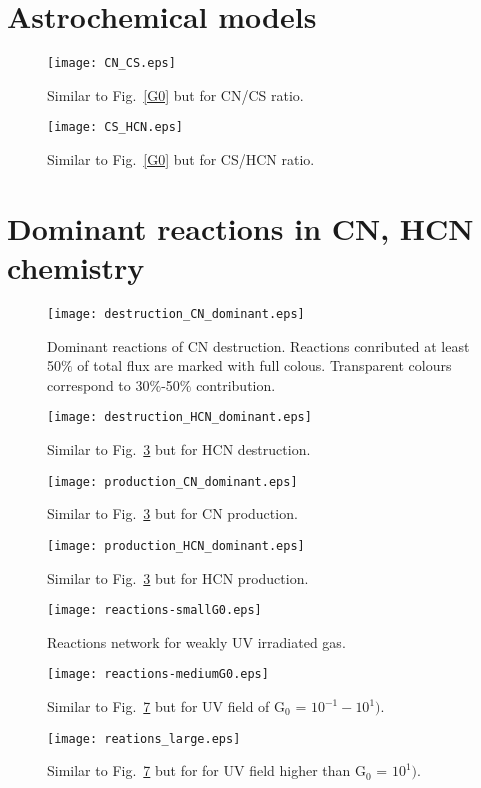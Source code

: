 \documentclass{aa}
\begin{document}
\begin{appendix}
\section{Astrochemical models}
\begin{figure}
   \centering
   \texttt{[image: CN\_CS.eps]}
      \caption{Similar to Fig.~\ref{G0} but for CN/CS ratio.}
         \label{CN/CS}
   \end{figure}

\begin{figure}
   \centering
   \texttt{[image: CS\_HCN.eps]}
      \caption{Similar to Fig.~\ref{G0} but for CS/HCN ratio.}
         \label{CS/HCN}
   \end{figure}

\section{Dominant reactions in CN, HCN chemistry}

\begin{figure}
\texttt{[image: destruction\_CN\_dominant.eps]}
\caption{Dominant reactions of CN destruction. Reactions conributed at least 50$\%$ of total flux are marked with full colous. Transparent colours correspond to 30$\%$-50$\%$ contribution.}
\label{CN_dest}
\end{figure}

\begin{figure}
\texttt{[image: destruction\_HCN\_dominant.eps]}
\caption{Similar to Fig.~\ref{CN_dest} but for HCN destruction.}
\label{HCN_dest}
\end{figure}

\begin{figure}
\texttt{[image: production\_CN\_dominant.eps]}
\caption{Similar to Fig.~\ref{CN_dest} but for CN production.}
\label{CN_prod}
\end{figure}

\begin{figure}
\texttt{[image: production\_HCN\_dominant.eps]}
\caption{Similar to Fig.~\ref{CN_dest} but for HCN production.}
\label{HCN_prod}
\end{figure}

\begin{figure}
\texttt{[image: reactions-smallG0.eps]}
\caption{Reactions network for weakly UV irradiated gas.}
\label{reactions_smallG0}
\end{figure}

\begin{figure}
\texttt{[image: reactions-mediumG0.eps]}
\caption{Similar to Fig.~\ref{reactions_smallG0} but for UV field of G$_0$ = $10^{-1} - 10^{1})$.}
\label{reactions_mediumG0}
\end{figure}

\begin{figure}
\texttt{[image: reations\_large.eps]}
\caption{Similar to Fig.~\ref{reactions_smallG0} but for for UV field higher than G$_0$ = $10^{1})$.}
\label{reactions_largeG0}
\end{figure}

\end{appendix}
\end{document}
